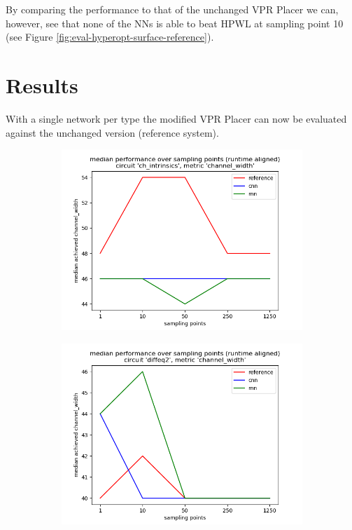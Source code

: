 By comparing the performance to that of the unchanged \gls{VPR} Placer we can, however, see that none of the \glspl{NN} is able to beat \gls{HPWL} at sampling point 10 (see Figure \ref{fig:eval-hyperopt-surface-reference}).

\section{Results}

With a single network per type the modified \gls{VPR} Placer can now be evaluated against the unchanged version (reference system).

\begin{figure}
	\centering
	\begin{subfigure}[b]{0.49\linewidth}
		\includegraphics[width=\linewidth]{plots/eval-ch_intrinsics-chan-width-median-full.png}
	\end{subfigure}
	\begin{subfigure}[b]{0.49\linewidth}
		\includegraphics[width=\linewidth]{plots/eval-diffeq2-chan-width-median-full.png}

\end{subfigure}
\end{figure}

